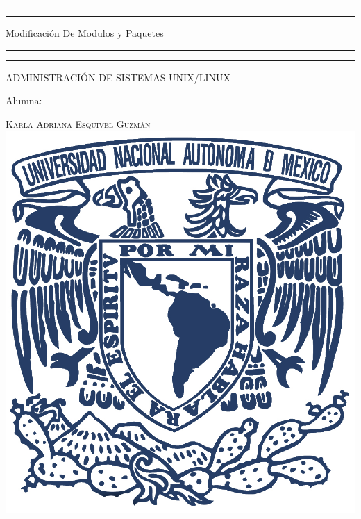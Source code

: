 \documentclass[a4paper, 11pt, oneside]{article}
\begin{document}
 

\begin{titlepage} 

	\centering 
	
	\scshape 
	
	\vspace*{\baselineskip} 
	
	
	
	\rule{\textwidth}{1.6pt}\vspace*{-\baselineskip}\vspace*{2pt} 
	\rule{\textwidth}{0.4pt} 
	
	\vspace{0.75\baselineskip} 
	
	{\LARGE Modificación De Modulos y Paquetes}	
	\vspace{0.75\baselineskip} 
	
	\rule{\textwidth}{0.4pt}\vspace*{-\baselineskip}\vspace{3.2pt}
	\rule{\textwidth}{1.6pt} 
	
	\vspace{2\baselineskip} 
	

	ADMINISTRACIÓN DE SISTEMAS UNIX/LINUX
	
	\vspace*{3\baselineskip} 
	
	
	
	Alumna:
	
	\vspace{0.5\baselineskip} 
	
	{\scshape\Large Karla Adriana Esquivel Guzmán \\} 
	\vspace{0.5\baselineskip} 
	\vfill
	\includegraphics{unam.jpg}
	

\end{titlepage}
\end{document}
